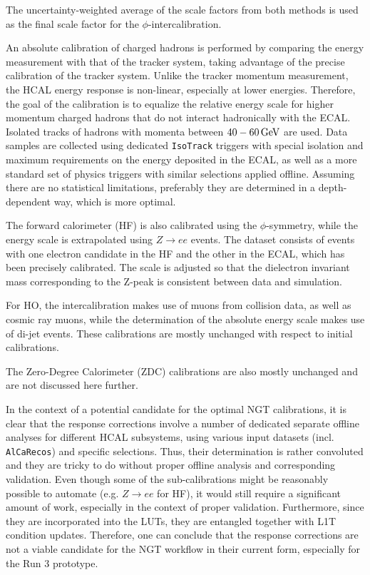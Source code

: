 The uncertainty-weighted average of the scale factors from both methods is used as the final scale factor for the $\phi$-intercalibration.

An absolute calibration of charged hadrons is performed by comparing the energy measurement with that of the tracker system, taking advantage of the precise calibration of the tracker system. Unlike the tracker momentum measurement, the HCAL energy response is non-linear, especially at lower energies. Therefore, the goal of the calibration is to equalize the relative energy scale for higher momentum charged hadrons that do not interact hadronically with the ECAL. Isolated tracks of hadrons with momenta between $40-60 \,\text{Ge\hspace{-.08em}V}$ are used. Data samples are collected using dedicated \texttt{IsoTrack} triggers with special isolation and maximum requirements on the energy deposited in the ECAL, as well as a more standard set of physics triggers with similar selections applied offline. Assuming there are no statistical limitations, preferably they are determined in a depth-dependent way, which is more optimal.

The forward calorimeter (HF) is also calibrated using the $\phi$-symmetry, while the energy scale is extrapolated using $Z \rightarrow ee$ events. The dataset consists of events with one electron candidate in the HF and the other in the ECAL, which has been precisely calibrated. The scale is adjusted so that the dielectron invariant mass corresponding to the Z-peak is consistent between data and simulation.

For HO, the intercalibration makes use of muons from collision data, as well as cosmic ray muons, while the determination of the absolute energy scale makes use of di-jet events. These calibrations are mostly unchanged with respect to initial calibrations.

The Zero-Degree Calorimeter (ZDC) calibrations are also mostly unchanged and are not discussed here further. 

In the context of a potential candidate for the optimal NGT calibrations, it is clear that the response corrections involve a number of dedicated separate offline analyses for different HCAL subsystems, using various input datasets (incl. \texttt{AlCaRecos}) and specific selections. Thus, their determination is rather convoluted and they are tricky to do without proper offline analysis and corresponding validation. Even though some of the sub-calibrations might be reasonably possible to automate (e.g. $Z \rightarrow ee$ for HF), it would still require a significant amount of work, especially in the context of proper validation. Furthermore, since they are incorporated into the LUTs, they are entangled together with L1T condition updates. Therefore, one can conclude that the response corrections are not a viable candidate for the NGT workflow in their current form, especially for the Run 3 prototype.

